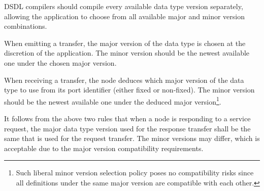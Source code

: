 DSDL compilers should compile every available data type version separately,
allowing the application to choose from all available major and minor version combinations.

When emitting a transfer, the major version of the data type is chosen at the discretion of the application.
The minor version should be the newest available one under the chosen major version.

When receiving a transfer, the node deduces which major version of the data type to use
from its port identifier (either fixed or non-fixed).
The minor version should be the newest available one under the deduced major version\footnote{%
    Such liberal minor version selection policy poses no compatibility risks since all definitions under the same
    major version are compatible with each other.
}.

It follows from the above two rules that when a node is responding to a service request,
the major data type version used for the response transfer shall be the same that is used for the request transfer.
The minor versions may differ, which is acceptable due to the major version compatibility requirements.


